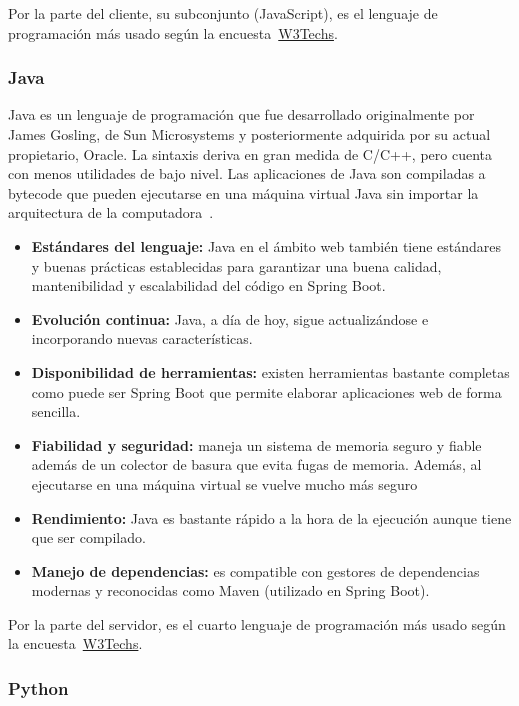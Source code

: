 Por la parte del cliente, su subconjunto (JavaScript), es el lenguaje de programación más usado según la encuesta~\href{https://w3techs.com/technologies/overview/client_side_language}{W3Techs}.

\subsubsection{Java}

Java es un lenguaje de programación que fue desarrollado originalmente por James Gosling, de Sun Microsystems y posteriormente adquirida por su actual propietario, Oracle. La sintaxis deriva en gran medida de C/C++, pero cuenta con menos utilidades de bajo nivel. Las aplicaciones de Java son compiladas a bytecode que pueden ejecutarse en una máquina virtual Java sin importar la arquitectura de la computadora~\cite{java-wiki}.

\begin{itemize}
    \item[\bien] \textbf{Estándares del lenguaje:} Java en el ámbito web también tiene estándares y buenas prácticas establecidas para garantizar una buena calidad, mantenibilidad y escalabilidad del código en Spring Boot.
    \item[\bien] \textbf{Evolución continua:} Java, a día de hoy, sigue actualizándose e incorporando nuevas características.
    \item[\bien] \textbf{Disponibilidad de herramientas:} existen herramientas bastante completas como puede ser Spring Boot que permite elaborar aplicaciones web de forma sencilla.
    \item[\esp] \textbf{Fiabilidad y seguridad:} maneja un sistema de memoria seguro y fiable además de un colector de basura que evita fugas de memoria. Además, al ejecutarse en una máquina virtual se vuelve mucho más seguro
    \item[\bien] \textbf{Rendimiento:} Java es bastante rápido a la hora de la ejecución aunque tiene que ser compilado.
    \item[\bien] \textbf{Manejo de dependencias:} es compatible con gestores de dependencias modernas y reconocidas como Maven (utilizado en Spring Boot).
\end{itemize}

Por la parte del servidor, es el cuarto lenguaje de programación más usado según la encuesta~\href{https://w3techs.com/technologies/overview/programming_language}{W3Techs}.

\subsubsection{Python}


